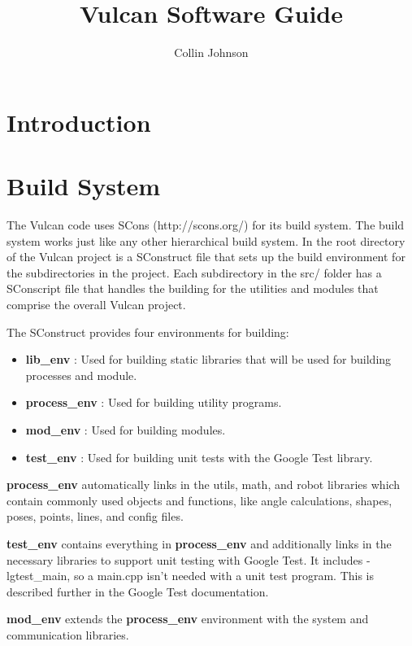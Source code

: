 \documentclass{article}
\title{Vulcan Software Guide}
\author{Collin Johnson}
\begin{document}
\maketitle
\tableofcontents

\section{Introduction}

\section{Build System}

The Vulcan code uses SCons (http://scons.org/) for its build system.  The build system works just like any other 
hierarchical build system. In the root directory of the Vulcan project is a SConstruct file that sets up the build 
environment for the subdirectories in the project. Each subdirectory in the src/ folder has a SConscript file that 
handles the building for the utilities and modules that comprise the overall Vulcan project.

The SConstruct provides four environments for building:

\begin{itemize}
 \item \textbf{lib\_env}     : Used for building static libraries that will be used for building processes and module.
 \item \textbf{process\_env} : Used for building utility programs.
 \item \textbf{mod\_env}     : Used for building modules.
 \item \textbf{test\_env}    : Used for building unit tests with the Google Test library.
\end{itemize}

\textbf{process\_env} automatically links in the utils, math, and robot libraries which contain commonly used objects 
and functions, like angle calculations, shapes, poses, points, lines, and config files.

\textbf{test\_env} contains everything in \textbf{process\_env} and additionally links in the necessary libraries to 
support unit testing with Google Test. It includes -lgtest\_main, so a main.cpp isn't needed with a unit test program. 
This is described further in the Google Test documentation.

\textbf{mod\_env} extends the \textbf{process\_env} environment with the system and communication libraries.
\end{document}
